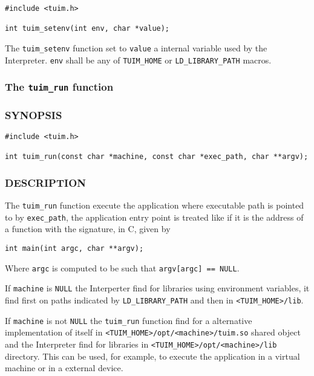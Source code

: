 \begin{lstlisting}[style=c]
#include <tuim.h>

int tuim_setenv(int env, char *value);
\end{lstlisting}

The \texttt{tuim\_setenv} function set to \texttt{value} a internal variable
used by the Interpreter. \texttt{env} shall be any of \texttt{TUIM\_HOME}
or \texttt{LD\_LIBRARY\_PATH} macros.

\subsubsection{The \texttt{tuim\_run} function}

\subsubsection*{SYNOPSIS}

\begin{lstlisting}[style=c]
#include <tuim.h>

int tuim_run(const char *machine, const char *exec_path, char **argv);
\end{lstlisting}

\subsubsection*{DESCRIPTION}

The \texttt{tuim\_run} function
execute the application where executable path is pointed to by
\texttt{exec\_path}, the application entry point is treated like if
it is the address of a function with the signature, in C, given by

\begin{lstlisting}[style=c]
int main(int argc, char **argv);
\end{lstlisting}

Where \texttt{argc} is computed to be such that \texttt{argv[argc] == NULL}.

If \texttt{machine} is \texttt{NULL}
the Interperter find for libraries using environment variables,
it find first on paths indicated by \texttt{LD\_LIBRARY\_PATH}
and then in \texttt{<TUIM\_HOME>/lib}.

If \texttt{machine} is not \texttt{NULL} the \texttt{tuim\_run} function
find for a alternative implementation of itself in
\texttt{<TUIM\_HOME>/opt/<machine>/tuim.so} shared object
and the Interpreter find for libraries in
\texttt{<TUIM\_HOME>/opt/<machine>/lib} directory.
This can be used, for example,
to execute the application in a virtual machine or in a external device.

